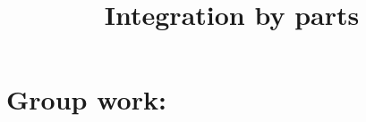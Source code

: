 \documentclass[]{ximera}
\title{Integration by parts}
\begin{document}
\begin{abstract}		\end{abstract}
\maketitle



\begin{comment}
\section{Warm up:}

	\begin{freeResponse}
	
	\end{freeResponse}
	
\begin{instructorNotes}

\end{instructorNotes}
\end{comment}







\section{Group work:}
\end{document}
